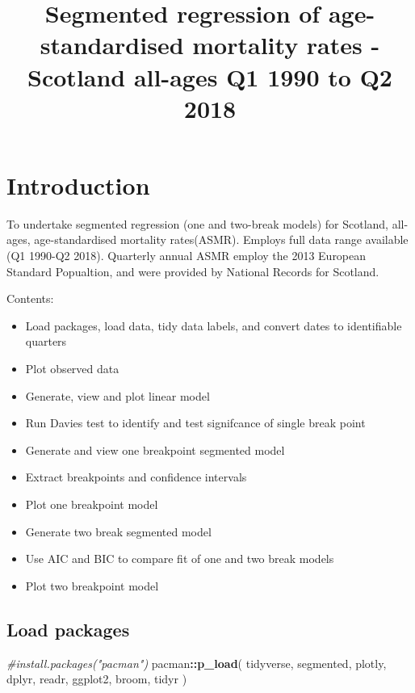 \documentclass[]{article}
\title{Segmented regression of age-standardised mortality rates - Scotland
all-ages Q1 1990 to Q2 2018}
\author{}
\date{}
\newenvironment{Shaded}{\begin{snugshade}}{\end{snugshade}}
\newcommand{\KeywordTok}[1]{\textcolor[rgb]{0.13,0.29,0.53}{\textbf{#1}}}
\newcommand{\CommentTok}[1]{\textcolor[rgb]{0.56,0.35,0.01}{\textit{#1}}}
\newcommand{\OperatorTok}[1]{\textcolor[rgb]{0.81,0.36,0.00}{\textbf{#1}}}
\newcommand{\NormalTok}[1]{#1}
\providecommand{\tightlist}{%
  \setlength{\itemsep}{0pt}\setlength{\parskip}{0pt}}
\begin{document}
\maketitle

\section{Introduction}\label{introduction}

To undertake segmented regression (one and two-break models) for
Scotland, all-ages, age-standardised mortality rates(ASMR). Employs full
data range available (Q1 1990-Q2 2018). Quarterly annual ASMR employ the
2013 European Standard Popualtion, and were provided by National Records
for Scotland.

Contents:

\begin{itemize}
\tightlist
\item
  Load packages, load data, tidy data labels, and convert dates to
  identifiable quarters
\item
  Plot observed data
\item
  Generate, view and plot linear model
\item
  Run Davies test to identify and test signifcance of single break point
\item
  Generate and view one breakpoint segmented model
\item
  Extract breakpoints and confidence intervals
\item
  Plot one breakpoint model
\item
  Generate two break segmented model
\item
  Use AIC and BIC to compare fit of one and two break models
\item
  Plot two breakpoint model
\end{itemize}

\subsection{Load packages}\label{load-packages}

\begin{Shaded}
\begin{Highlighting}[]
\CommentTok{#install.packages("pacman")}
\NormalTok{pacman}\OperatorTok{::}\KeywordTok{p_load}\NormalTok{(}
\NormalTok{  tidyverse,}
\NormalTok{  segmented,}
\NormalTok{  plotly,}
\NormalTok{  dplyr,}
\NormalTok{  readr,}
\NormalTok{  ggplot2,}
\NormalTok{  broom,}
\NormalTok{  tidyr}
\NormalTok{               )}
\end{Highlighting}
\end{Shaded}
\end{document}

